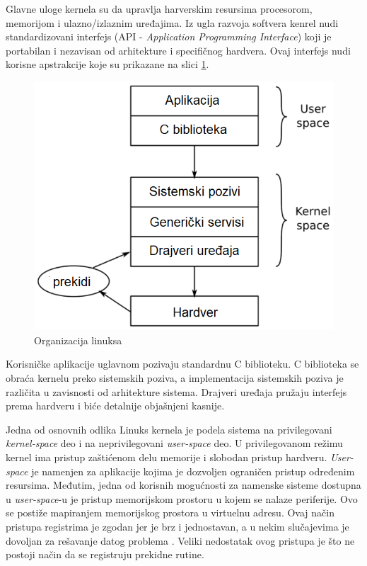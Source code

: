 Glavne uloge kernela su da upravlja harverskim resursima procesorom, memorijom i ulazno/izlaznim uređajima. Iz ugla razvoja softvera kenrel nudi standardizovani interfejs (API - \textit{Application Programming Interface}) koji je portabilan i nezavisan od arhitekture i specifičnog hardvera. Ovaj interfejs nudi korisne apstrakcije koje su prikazane na slici \ref{slika1:linux1}.\\
\begin{figure}[h!]
\centering
\includegraphics[scale=0.5]{img/linux1.png}
\caption{Organizacija linuksa}
\label{slika1:linux1}
\end{figure}

Korisničke aplikacije uglavnom pozivaju standardnu C biblioteku. C biblioteka se obraća kernelu preko sistemskih poziva, a implementacija sistemskih poziva je različita u zavisnosti od arhitekture sistema. Drajveri uređaja pružaju interfejs prema hardveru i biće detalnije objašnjeni kasnije.

Jedna od osnovnih odlika Linuks kernela je podela sistema na privilegovani \textit{kernel-space} deo i na neprivilegovani \textit{user-space} deo. U privilegovanom režimu kernel ima pristup zaštićenom delu memorije i slobodan pristup hardveru. \textit{User-space} je namenjen za aplikacije kojima je dozvoljen ograničen pristup određenim resursima. Međutim, jedna od korisnih mogućnosti za namenske sisteme dostupna u \textit{user-space}-u je pristup memorijskom prostoru u kojem se nalaze periferije. Ovo se postiže mapiranjem memorijskog prostora u virtuelnu adresu. Ovaj način pristupa registrima je zgodan jer je brz i jednostavan, a u nekim slučajevima je dovoljan za rešavanje datog problema \cite{mmap}. Veliki nedostatak ovog pristupa je što ne postoji način da se registruju prekidne rutine.

